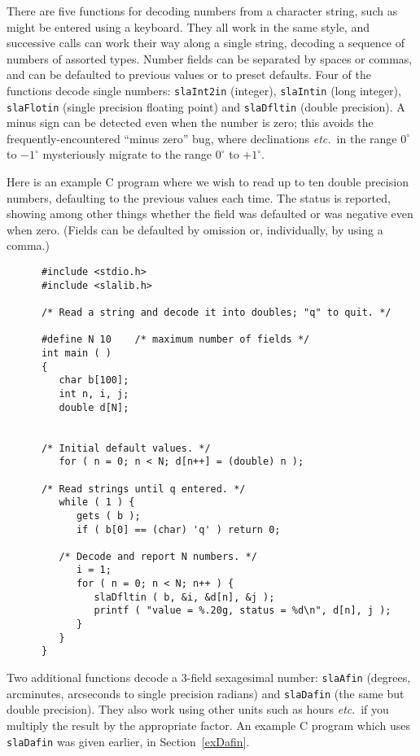 \documentclass[11pt,fleqn,twoside]{article}
\renewcommand{\_}{{\tt\char'137}}     %
\begin{document}
There are five functions for decoding numbers from a character
string, such as might be entered using a keyboard.
They all work in the same style, and successive calls
can work their way along a single string, decoding
a sequence of numbers of assorted types.  Number
fields can be separated by spaces or commas, and can be defaulted
to previous values or to preset defaults.
Four of the functions decode single numbers:
{\tt slaInt2in}
(integer),
{\tt slaIntin}
(long integer),
{\tt slaFlotin}
(single precision floating point) and
{\tt slaDfltin}
(double precision).  A minus sign can be
detected even when the number is zero;  this avoids
the frequently-encountered ``minus zero'' bug, where
declinations {\it etc.}\ in
the range $0^{\circ}$ to $-1^{\circ}$ mysteriously migrate to
the range $0^{\circ}$ to $+1^{\circ}$.

Here is an example C program where we wish to
read up to ten double precision numbers, defaulting to the
previous values each time.  The status is reported, showing
among other things whether the field was defaulted or was
negative even when zero.  (Fields can be defaulted by omission
or, individually, by using a comma.)
\goodbreak
\vspace{-3ex}
\begin{verbatim}
      #include <stdio.h>
      #include <slalib.h>

      /* Read a string and decode it into doubles; "q" to quit. */

      #define N 10    /* maximum number of fields */
      int main ( )
      {
         char b[100];
         int n, i, j;
         double d[N];


      /* Initial default values. */
         for ( n = 0; n < N; d[n++] = (double) n );

      /* Read strings until q entered. */
         while ( 1 ) {
            gets ( b );
            if ( b[0] == (char) 'q' ) return 0;

         /* Decode and report N numbers. */
            i = 1;
            for ( n = 0; n < N; n++ ) {
               slaDfltin ( b, &i, &d[n], &j );
               printf ( "value = %.20g, status = %d\n", d[n], j );
            }
         }
      }
\end{verbatim}
\vspace{-3ex}
\goodbreak
Two additional functions decode a 3-field sexagesimal number:
{\tt slaAfin}
(degrees, arcminutes, arcseconds to single
precision radians) and
{\tt slaDafin}
(the same but double precision).  They also
work using other units such as hours {\it etc}.\ if
you multiply the result by the appropriate factor.  An example
C program which uses
{\tt slaDafin}
was given earlier, in Section~\ref{exDafin}.
\end{document}

